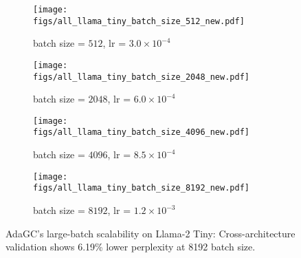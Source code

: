 \begin{figure*}[!t]
    \vskip 0.1in
    \centering
    \begin{subfigure}{0.5\textwidth}
        \centering
        \texttt{[image: figs/all\_llama\_tiny\_batch\_size\_512\_new.pdf]}
        \caption{batch size = $512$, lr = $3.0 \times 10^{-4}$}
        \label{fig:llama_tiny_bs_512}
    \end{subfigure}\hfill
    \begin{subfigure}{0.5\textwidth}
        \centering
        \texttt{[image: figs/all\_llama\_tiny\_batch\_size\_2048\_new.pdf]}
        \caption{batch size = $2048$, lr = $6.0 \times 10^{-4}$}
        \label{fig:llama_tiny_bs_2048}
    \end{subfigure}\vfill
    \begin{subfigure}{0.5\textwidth}
        \centering
        \texttt{[image: figs/all\_llama\_tiny\_batch\_size\_4096\_new.pdf]}
        \caption{batch size = $4096$, lr = $8.5 \times 10^{-4}$}
    \end{subfigure}\hfill
    \begin{subfigure}{0.5\textwidth}
        \centering
        \texttt{[image: figs/all\_llama\_tiny\_batch\_size\_8192\_new.pdf]}
        \caption{batch size = $8192$, lr = $1.2 \times 10^{-3}$}
    \end{subfigure}
    \caption{AdaGC's large-batch scalability on Llama-2 Tiny: Cross-architecture validation shows 6.19\% lower perplexity at 8192 batch size.}
    \label{fig:llama_tiny_large_bs_and_lr}
    \vskip -0.1in
\end{figure*}
